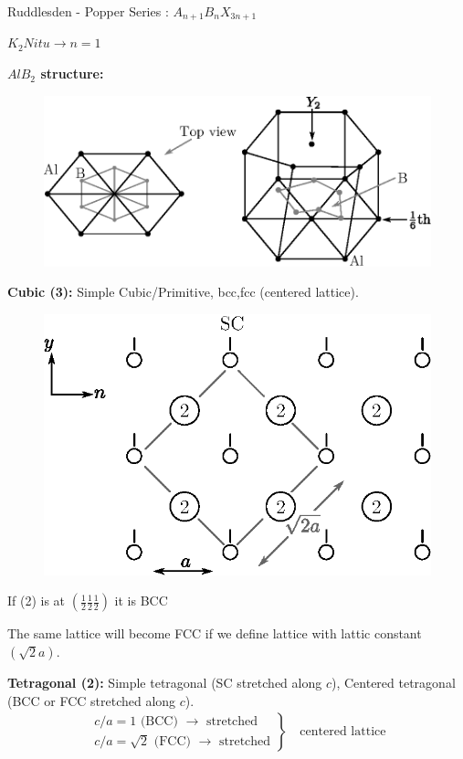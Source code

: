 \noindent
Ruddlesden - Popper Series : $A_{n+1}B_{n}X_{3n+1}$

\smallskip
\noindent
$K_{2}Nitu\to n=1$

\smallskip
\noindent
\textbf{\boldmath$AlB_{2}$ structure:}
\begin{figure}[H]
\centering
\includegraphics[scale=.8]{images/lecture3/fig4.eps}
\end{figure}

\smallskip
\noindent
\textbf{Cubic (3):} Simple Cubic/Primitive, bcc,fcc (centered lattice).
\begin{figure}[H]
\centering
\includegraphics[scale=.8]{images/lecture3/fig5.eps}
\end{figure}
If (2) is at $(\frac{1}{2}\frac{1}{2}\frac{1}{2})$ it is BCC

The same lattice will become FCC if we define lattice with lattic constant $(\sqrt{2}a)$.

\medskip
\noindent
\textbf{Tetragonal (2):} Simple tetragonal (SC stretched along $c$), Centered tetragonal (BCC or FCC stretched along $c$).
\begin{align*}
\left.
\begin{array}{l}
c/a=1 \text{ (BCC) } \to \text{ stretched}\\
c/a=\sqrt{2} \text{ (FCC) } \to \text{ stretched}
\end{array}\right\}
\quad\text{centered lattice}
\end{align*}

